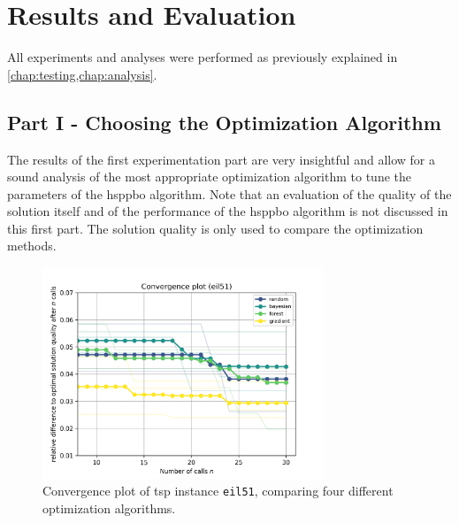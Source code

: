 

\chapter{Results and Evaluation}
\label{chap:results}

All experiments and analyses were performed as previously explained in \cref{chap:testing,chap:analysis}. 

\section{Part I - Choosing the Optimization Algorithm}
\label{chap:part1}
The results of the first experimentation part are very insightful and allow for a sound analysis of the most appropriate optimization algorithm to tune the parameters of the \gls{hsppbo} algorithm. Note that an evaluation of the quality of the solution itself and of the performance of the \gls{hsppbo} algorithm is not discussed in this first part. The solution quality is only used to compare the optimization methods. 

\begin{figure}[h]
	\centering
	\includegraphics[width=0.75\textwidth]{results/part1/convergence_eil51.png}
	\caption[Convergence plot of \gls{tsp} instance \texttt{eil51}]{Convergence plot of \gls{tsp} instance \texttt{eil51}, comparing four different optimization algorithms.}
	\label{fig:convergence_eil51}
\end{figure}

